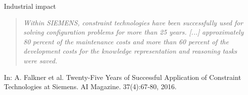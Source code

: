 \begin{frame}[c]{Industrial impact}
\begin{quote}\itshape
  Within SIEMENS,
  \alert<2>{constraint technologies} have been successfully used for solving configuration problems for more than \alert<2>{25 years}.
  [...]
  approximately \alert<3>{80 percent} of the \alert<3>{maintenance costs} and
  more than \alert<3>{60 percent} of the \alert<3>{development costs} for the knowledge representation and reasoning tasks were saved.
\end{quote}
\medskip
\tiny
In:
A. Falkner et al.
Twenty-Five Years of Successful Application of Constraint Technologies at Siemens.
AI Magazine.
37(4):67-80, 2016.
\end{frame}
